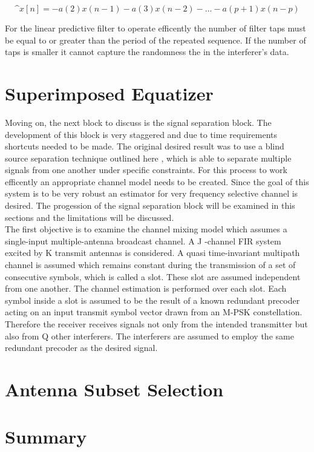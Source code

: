 \[ \^{x}[n]=-a(2)x(n-1)-a(3)x(n-2)-...-a(p+1)x(n-p)\]

For the linear predictive filter to operate efficently the number of filter taps must be equal to or greater than the period of the repeated sequence.  If the number of taps is smaller it cannot capture the randomness the in the interferer's data.\\

\section{Superimposed Equatizer}

Moving on, the next block to discuss is the signal separation block.  The development of this block is very staggered and due to time requirements shortcuts needed to be made.  The original desired result was to use a blind source separation technique outlined here \cite{AMUSE}, which is able to separate multiple signals from one another under specific constraints.  For this process to work efficently an appropriate channel model needs to be created.  Since the goal of this system is to be very robust an estimator for very frequency selective channel is desired.  The progession of the signal separation block will be examined in this sections and the limitations will be discussed.\\

The first objective is to examine the channel mixing model which assumes a single-input multiple-antenna broadcast channel.  A J -channel FIR system excited by K transmit antennas is considered. A quasi time-invariant multipath channel is assumed which remains constant during the transmission of a set of consecutive symbols, which is called a slot. These slot are assumed independent from one another.  The channel estimation is performed over each slot. Each symbol inside a slot is assumed to be the result of a known redundant precoder acting on an input transmit symbol vector drawn from an M-PSK constellation. Therefore the receiver receives signals not only from the intended transmitter but also from Q other interferers. The interferers are assumed to employ the same redundant precoder as the desired signal\cite{skrkantPHD}.

\section{Antenna Subset Selection}


\section{Summary}
